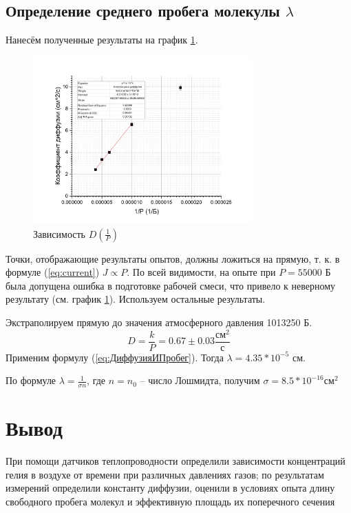 \documentclass[a4paper]{article}
\begin{document}
\subsection{Определение среднего пробега молекулы $\lambda$}
Нанесём полученные результаты на график \ref{fig:К.Дифф.}. 
\begin{figure}[htbp]
	\centering
		\includegraphics[width=0.75\textwidth]{К. Дифф..jpg}
	\caption{Зависимость $D (\frac{1}{P})$}
	\label{fig:К.Дифф.}
\end{figure}
Точки, отображающие результаты опытов, должны ложиться на прямую, т. к. в формуле (\ref{eq:current}) $J \propto P$. По всей видимости, на опыте при $P = 55000$ Б была допущена ошибка в подготовке рабочей смеси, что привело к неверному результату (см. график \ref{fig:К.Дифф.}). Используем остальные результаты.

Экстраполируем прямую до значения атмосферного давления 1013250 Б. 
\begin{equation}
D = \frac{k}{P} = 0.67 \pm 0.03 \frac{см^2}{с}
\label{eq:экстраполяция}
\end{equation}
Применим формулу (\ref{eq:ДиффузияИПробег}). Тогда $\lambda = 4.35 * 10^{-5}$ см.

По формуле $\lambda = \frac{1}{\sigma n}$, где $n = n_0$ -- число Лошмидта, получим $\sigma = 8.5 * 10^{-16} см^2$
\section{Вывод}
При помощи датчиков теплопроводности определили зависимости концентраций гелия в воздухе от времени при различных давлениях газов; по результатам измерений определили константу диффузии, оценили в условиях опыта длину свободного пробега молекул и эффективную площадь их поперечного сечения
\end{document}

